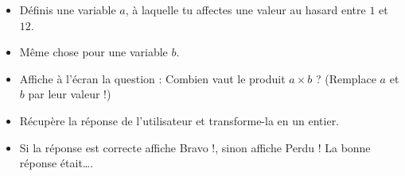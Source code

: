 \documentclass[11pt,class=report,crop=false]{standalone}
\begin{document}
\begin{activite}


\begin{itemize}
  \item Définis une variable $a$, à laquelle tu affectes une valeur au hasard entre $1$ et $12$.
  
  \item Même chose pour une variable $b$.
  
  
  \item Affiche à l'écran la question : \og{}Combien vaut le produit $a \times b$ ?\fg{}
  (Remplace $a$ et $b$ par leur valeur !)
  
  \item Récupère la réponse de l'utilisateur et transforme-la en un entier.
  
  \item Si la réponse est correcte affiche \og{}Bravo !\fg{}, sinon affiche \og{}Perdu ! La bonne réponse était\ldots\fg{}.
\end{itemize}



\end{activite}


\end{document}
